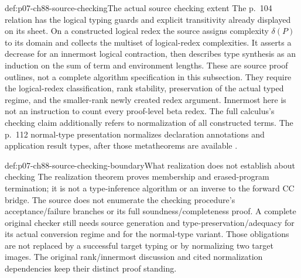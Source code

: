 \begin{hbmethod}{def:p07-ch88-source-checking}{The actual source checking extent}
The p.~104 relation has the logical typing guards and explicit transitivity
already displayed on its sheet. On a constructed logical redex the source
assigns complexity \(\delta(P)\) to its domain and collects the
multiset of logical-redex complexities. It asserts a decrease for an
innermost logical contraction, then describes type synthesis as an
induction on the sum of term and environment lengths. These are source
proof outlines, not a complete algorithm specification in this subsection.
They require the logical-redex classification, rank stability, preservation
of the actual typed regime, and the smaller-rank newly created redex argument.
Innermost here is not an instruction to count every proof-level beta redex.
The full calculus's checking claim additionally refers to normalization of
all constructed terms. The p.~112 normal-type presentation normalizes
declaration annotations and application result types, after those
metatheorems are available \cite[pp.~104--105,112]{CoquandHuet1988}.
\end{hbmethod}

\begin{proofboundary}{def:p07-ch88-source-checking-boundary}{What realization does not establish about checking}
The realization theorem proves membership and erased-program termination;
it is not a type-inference algorithm or an inverse to the forward CC bridge.
The source does not enumerate the checking procedure's acceptance/failure
branches or its full soundness/completeness proof. A complete original
checker still needs source generation and type-preservation/adequacy for
its actual conversion regime and for the normal-type variant. Those
obligations are not replaced by a successful target typing or by normalizing
two target images. The original rank/innermost discussion and cited
normalization dependencies keep their distinct proof standing.
\end{proofboundary}
